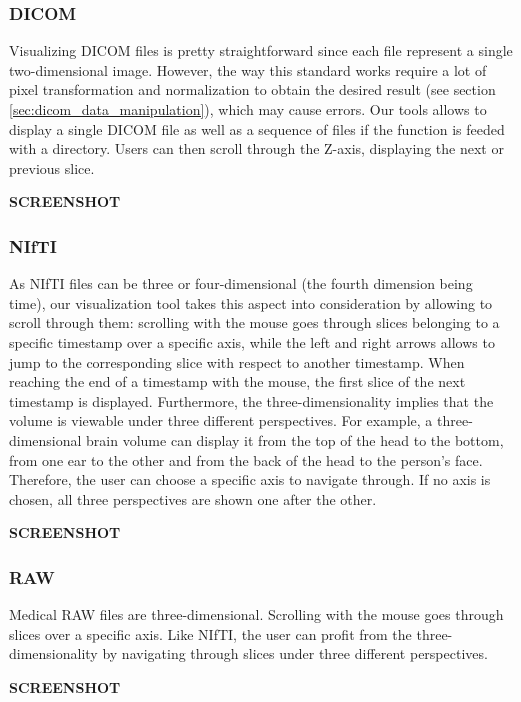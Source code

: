 \subsubsection{DICOM}

Visualizing DICOM files is pretty straightforward since each file represent a single two-dimensional image. However, the way this standard works require a lot of pixel transformation and normalization to obtain the desired result (see section \ref{sec:dicom_data_manipulation}), which may cause errors. Our tools allows to display a single DICOM file as well as a sequence of files if the function is feeded with a directory. Users can then scroll through the Z-axis, displaying the next or previous slice. 

\textbf{SCREENSHOT}


\subsubsection{NIfTI}

As NIfTI files can be three or four-dimensional (the fourth dimension being time), our visualization tool takes this aspect into consideration by allowing to scroll through them: scrolling with the mouse goes through slices belonging to a specific timestamp over a specific axis, while the left and right arrows allows to jump to the corresponding slice with respect to another timestamp. When reaching the end of a timestamp with the mouse, the first slice of the next timestamp is displayed. Furthermore, the three-dimensionality implies that the volume is viewable under three different perspectives. For example, a three-dimensional brain volume can display it from the top of the head to the bottom, from one ear to the other and from the back of the head to the person's face. Therefore, the user can choose a specific axis to navigate through. If no axis is chosen, all three perspectives are shown one after the other.

\textbf{SCREENSHOT}


\subsubsection{RAW}

Medical RAW files are three-dimensional. Scrolling with the mouse goes through slices over a specific axis. Like NIfTI, the user can profit from the three-dimensionality by navigating through slices under three different perspectives.

\textbf{SCREENSHOT}
